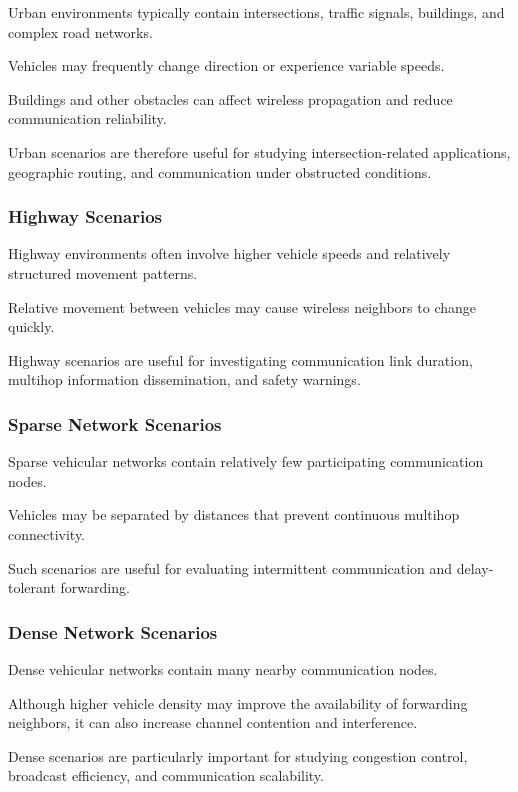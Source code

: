 Urban environments typically contain
intersections, traffic signals,
buildings, and complex road networks.

Vehicles may frequently change
direction or experience variable speeds.

Buildings and other obstacles can
affect wireless propagation and
reduce communication reliability.

Urban scenarios are therefore useful
for studying intersection-related
applications, geographic routing,
and communication under obstructed
conditions.

\subsubsection{Highway Scenarios}

Highway environments often involve
higher vehicle speeds and relatively
structured movement patterns.

Relative movement between vehicles
may cause wireless neighbors
to change quickly.

Highway scenarios are useful
for investigating communication
link duration, multihop information
dissemination, and safety warnings.

\subsubsection{Sparse Network Scenarios}

Sparse vehicular networks contain
relatively few participating
communication nodes.

Vehicles may be separated by
distances that prevent continuous
multihop connectivity.

Such scenarios are useful for
evaluating intermittent communication
and delay-tolerant forwarding.

\subsubsection{Dense Network Scenarios}

Dense vehicular networks contain
many nearby communication nodes.

Although higher vehicle density
may improve the availability
of forwarding neighbors,
it can also increase channel
contention and interference.

Dense scenarios are particularly
important for studying congestion
control, broadcast efficiency,
and communication scalability.

